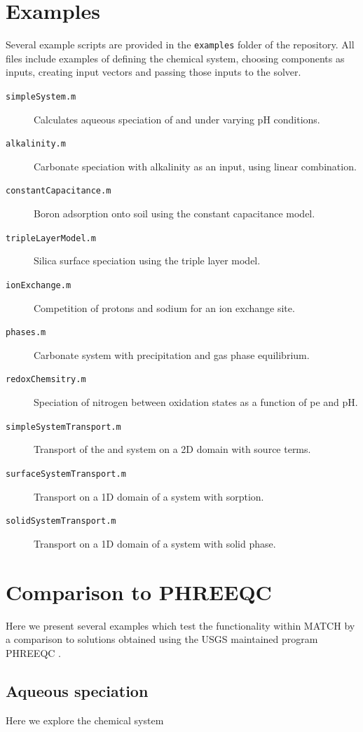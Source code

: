 \documentclass{article}
\begin{document}
\section{Examples}
Several example scripts are provided in the \verb|examples| folder of the repository. All files include examples of defining the chemical system, choosing components as inputs, creating input vectors and passing those inputs to the solver. 
\begin{description}
        \item[\texttt{simpleSystem.m}] Calculates aqueous speciation of  and  under varying pH conditions.
        \item[\texttt{alkalinity.m}] Carbonate speciation with alkalinity as an input, using linear combination.
        \item[\texttt{constantCapacitance.m}] Boron adsorption onto soil using the constant capacitance model.
        \item[\texttt{tripleLayerModel.m}] Silica surface speciation using the triple layer model.
        \item[\texttt{ionExchange.m}] Competition of protons and sodium for an ion exchange site.
        \item[\texttt{phases.m}] Carbonate system with precipitation and gas phase equilibrium.
        \item[\texttt{redoxChemsitry.m}] Speciation of nitrogen between oxidation states as a function of pe and pH.
        \item[\texttt{simpleSystemTransport.m}] Transport of the  and  system on a 2D domain with source terms.
        \item[\texttt{surfaceSystemTransport.m}] Transport on a 1D domain of a system with sorption.
        \item[\texttt{solidSystemTransport.m}] Transport on a 1D domain of a system with solid phase.
\end{description}

\section{Comparison to PHREEQC}

Here we present several examples which test the functionality within MATCH by a comparison to solutions obtained using the USGS maintained program PHREEQC \cite{parkhurst1999}{}.

\subsection{Aqueous speciation}
Here we explore the chemical system
\end{document}
